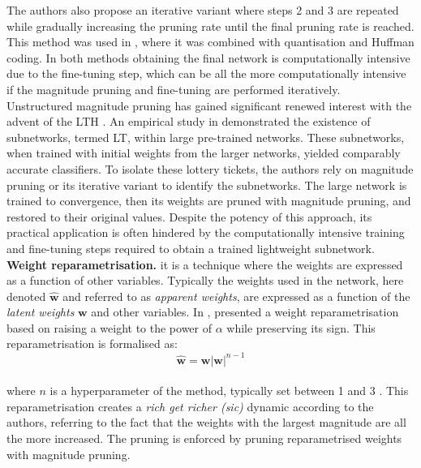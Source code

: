 The authors also propose an iterative variant where steps 2 and 3 are
repeated while gradually increasing the pruning rate until the final pruning
rate is reached. This method was used in \cite{DBLP:journals/corr/HanMD15},
where it was combined with quantisation and Huffman coding. In both methods
\cite{DBLP:conf/nips/HanPTD15,DBLP:journals/corr/HanMD15} obtaining the final
network is computationally intensive due to the fine-tuning step, which can be
all the more computationally intensive if the magnitude pruning and fine-tuning
are performed iteratively. \\


Unstructured magnitude pruning has gained significant renewed interest with the
advent of the \acf{LTH} \cite{DBLP:conf/iclr/FrankleC19}. An empirical study in
\cite{DBLP:conf/iclr/FrankleC19} demonstrated the existence of subnetworks,
termed \acf{LT}, within large pre-trained networks. These subnetworks, when
trained with initial weights from the larger networks, yielded comparably
accurate classifiers. To isolate these lottery tickets, the authors rely on
magnitude pruning or its iterative variant to identify the subnetworks. The
large network is trained to convergence, then its weights are pruned with
magnitude pruning, and restored to their original values. Despite the potency of
this approach, its practical application is often hindered by the
computationally intensive training and fine-tuning steps required to obtain a
trained lightweight subnetwork.\\


\noindent \textbf{Weight reparametrisation.} it is a
technique where the weights are expressed as a function of other variables.
Typically the weights used in the network, here denoted $\mathbf{\hat{w}}$ and
referred to as \emph{apparent weights}, are expressed as a function of the
\emph{latent weights} $\mathbf{w}$ and other variables. In \cite{powerprop},
\citeauthor{powerprop} presented a weight reparametrisation based on raising a
weight to the power of $\alpha$ while preserving its sign. This
reparametrisation is formalised as: \\

\begin{equation}
  \label{eqn:chap1:power_propagation}
  \mathbf{\hat{w}} = \mathbf{w} |\mathbf{w}|^{n-1}
\end{equation}\\

\noindent where $n$ is a hyperparameter of the method, typically set
between 1 and 3 \cite{powerprop}. This reparametrisation
creates a \emph{rich get richer (sic)} dynamic according to the authors,
referring to the fact that the weights with the largest magnitude are all the
more increased. The pruning is enforced by pruning reparametrised weights with
magnitude pruning.\\


